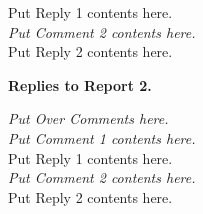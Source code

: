 \documentclass[11pt,a4paper]{article}
\begin{document}
  Put Reply 1 contents here.\\

 {\it Put Comment 2 contents here.}\\

  Put Reply 2 contents here.\\



\begin{center} \textbf{\large Replies to Report 2.} \end{center}

{\it Put Over Comments here.}\\


 {\it Put Comment 1 contents here.}\\

  Put Reply 1 contents here.\\

 {\it Put Comment 2 contents here.}\\

  Put Reply 2 contents here.\\
\end{document}
